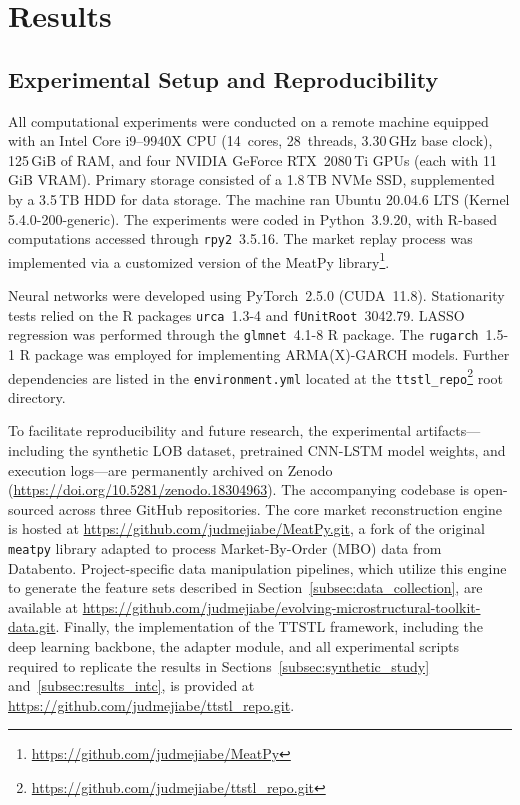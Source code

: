 \documentclass{rQUF2e}
\theoremstyle{plain}
\theoremstyle{definition}
\theoremstyle{remark}
\begin{document}
\section{Results}
\label{sec:results}

\subsection{Experimental Setup and Reproducibility}
\label{subsec:exp_setup}

All computational experiments were conducted on a remote machine equipped with an Intel Core i9--9940X CPU (14~cores, 28~threads, 3.30\,GHz base clock), 125\,GiB of RAM, and four NVIDIA GeForce RTX~2080\,Ti GPUs (each with 11\,GiB VRAM). Primary storage consisted of a 1.8\,TB NVMe SSD, supplemented by a 3.5\,TB HDD for data storage. The machine ran Ubuntu 20.04.6 LTS (Kernel 5.4.0-200-generic). The experiments were coded in Python~3.9.20, with R-based computations accessed through \verb|rpy2|~3.5.16. The market replay process was implemented via a customized version of the MeatPy library\footnote{\url{https://github.com/judmejiabe/MeatPy}}.

Neural networks were developed using PyTorch~2.5.0 (CUDA~11.8). Stationarity tests relied on the R packages \verb|urca|~1.3-4 and \verb|fUnitRoot|~3042.79. LASSO regression was performed through the \verb|glmnet|~4.1-8 R package. The \verb|rugarch|~1.5-1 R package was employed for implementing ARMA(X)-GARCH models. Further dependencies are listed in the \verb|environment.yml| located at the \verb|ttstl_repo|\footnote{\url{https://github.com/judmejiabe/ttstl_repo.git}} root directory.

To facilitate reproducibility and future research, the experimental artifacts—including the synthetic LOB dataset, pretrained CNN-LSTM model weights, and execution logs—are permanently archived on Zenodo (\url{https://doi.org/10.5281/zenodo.18304963}). The accompanying codebase is open-sourced across three GitHub repositories. 
The core market reconstruction engine is hosted at \url{https://github.com/judmejiabe/MeatPy.git}, a fork of the original \verb|meatpy| library adapted to process Market-By-Order (MBO) data from Databento. Project-specific data manipulation pipelines, which utilize this engine to generate the feature sets described in Section~\ref{subsec:data_collection}, are available at \url{https://github.com/judmejiabe/evolving-microstructural-toolkit-data.git}.
Finally, the implementation of the TTSTL framework, including the deep learning backbone, the adapter module, and all experimental scripts required to replicate the results in Sections~\ref{subsec:synthetic_study} and~\ref{subsec:results_intc}, is provided at \url{https://github.com/judmejiabe/ttstl_repo.git}.
\end{document}

